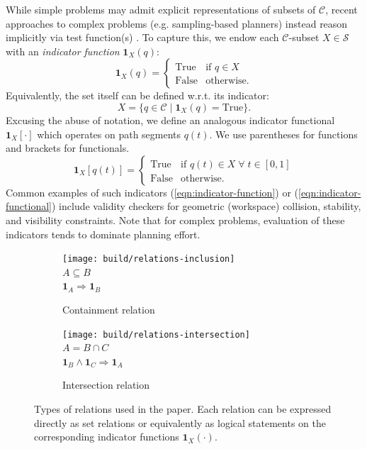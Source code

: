 While simple problems may admit explicit representations of
subsets of $\mathcal{C}$,
recent approaches to complex problems
(e.g. sampling-based planners)
instead reason implicitly via test function(s)
\cite{lavalle2006planningbook}.
To capture this,
we endow each $\mathcal{C}$-subset $X \in \mathcal{S}$ with an
\emph{indicator function} $\mathbf{1}_X(q)$:
\begin{equation}
  \mathbf{1}_X(q) =
    \left\{ \begin{array}{ll}
      \mbox{True} & \mbox{if } q \in X \\
      \mbox{False} & \mbox{otherwise}.
    \end{array} \right.
  \label{eqn:indicator-function}
\end{equation}
Equivalently, the set itself can be defined w.r.t. its indicator:
\begin{equation}
  X = \{ q \in \mathcal{C} \;|\; \mathbf{1}_X(q) = \mbox{True} \} .
\end{equation}
Excusing the abuse of notation,
we define an analogous indicator functional $\mathbf{1}_X[\cdot]$
which operates on path segments $q(t)$.
We use parentheses for functions and brackets for functionals.
\begin{equation}
  \mathbf{1}_X[q(t)] =
    \left\{ \begin{array}{ll}
      \mbox{True} & \mbox{if } q(t) \in X \;\forall\; t \in [0,1] \\
      \mbox{False} & \mbox{otherwise}.
    \end{array} \right.
  \label{eqn:indicator-functional}
\end{equation}
Common examples of such indicators
(\ref{eqn:indicator-function}) or (\ref{eqn:indicator-functional})
include validity checkers for
geometric (workspace) collision,
stability, and visibility constraints.
Note that for complex problems,
evaluation of these indicators 
tends to dominate planning effort.

\begin{figure}
\centering
\begin{subfigure}[t]{0.45\linewidth}
\centering
\texttt{[image: build/relations-inclusion]} \\
$A \subseteq B$ \\
$\mathbf{1}_A \Rightarrow \mathbf{1}_B$
\caption{Containment relation}
\end{subfigure}%
\quad\quad%
\begin{subfigure}[t]{0.45\linewidth}
\centering
\texttt{[image: build/relations-intersection]} \\
$A = B \cap C$ \\
$\mathbf{1}_B \wedge \mathbf{1}_C \Rightarrow \mathbf{1}_A$
\caption{Intersection relation}
\end{subfigure}
\caption{Types of relations used in the paper.
  Each relation can be expressed directly as set relations
  or equivalently as logical statements
  on the corresponding indicator functions
  $\mathbf{1}_X(\cdot)$.}
\label{fig:relations}
\end{figure}

